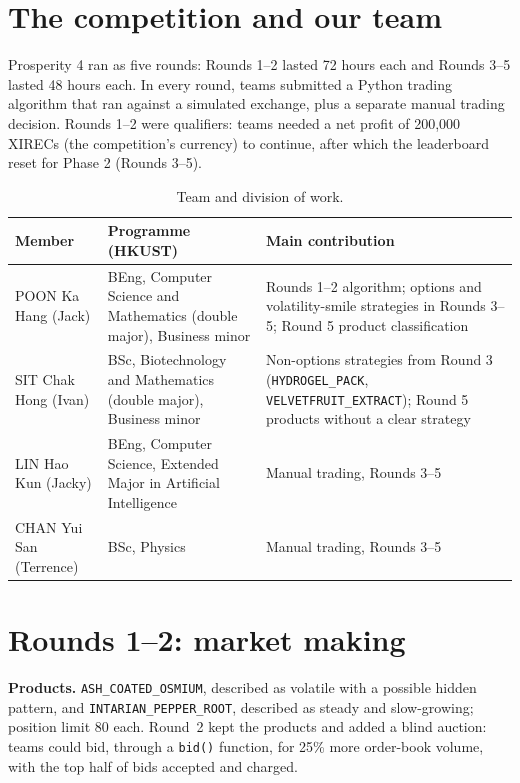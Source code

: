 \documentclass[11pt,a4paper]{article}
\newcommand{\pname}[1]{\texttt{#1}}
\begin{document}
\section{The competition and our team}

Prosperity 4 ran as five rounds: Rounds 1--2 lasted 72 hours each and Rounds 3--5 lasted 48 hours each. In every round, teams submitted a Python trading
algorithm that ran against a simulated exchange, plus a separate manual trading decision. Rounds 1--2 were
qualifiers: teams needed a net profit of 200,000 XIRECs (the competition's currency) to continue, after which
the leaderboard reset for Phase 2 (Rounds 3--5).

\begin{table}[htbp]
\centering\footnotesize
\begin{tabularx}{\textwidth}{@{}l >{\raggedright\arraybackslash}X >{\raggedright\arraybackslash}X@{}}
\toprule
Member & Programme (HKUST) & Main contribution \\
\midrule
POON Ka Hang (Jack) & BEng, Computer Science and Mathematics (double major), Business minor &
Rounds 1--2 algorithm; options and volatility-smile strategies in Rounds 3--5; Round 5 product classification \\
SIT Chak Hong (Ivan) & BSc, Biotechnology and Mathematics (double major), Business minor &
Non-options strategies from Round 3 (\pname{HYDROGEL\_PACK}, \pname{VELVETFRUIT\_EXTRACT}); Round 5 products without a clear strategy \\
LIN Hao Kun (Jacky) & BEng, Computer Science, Extended Major in Artificial Intelligence & Manual trading, Rounds 3--5 \\
CHAN Yui San (Terrence) & BSc, Physics & Manual trading, Rounds 3--5 \\
\bottomrule
\end{tabularx}
\caption{Team and division of work.}
\end{table}

\section{Rounds 1--2: market making}

\textbf{Products.} \pname{ASH\_COATED\_OSMIUM}, described as volatile with a possible hidden pattern, and
\pname{INTARIAN\_PEPPER\_ROOT}, described as steady and slow-growing; position limit 80 each. Round~2 kept the
products and added a blind auction: teams could bid, through a \texttt{bid()} function, for 25\% more
order-book volume, with the top half of bids accepted and charged.
\end{document}
